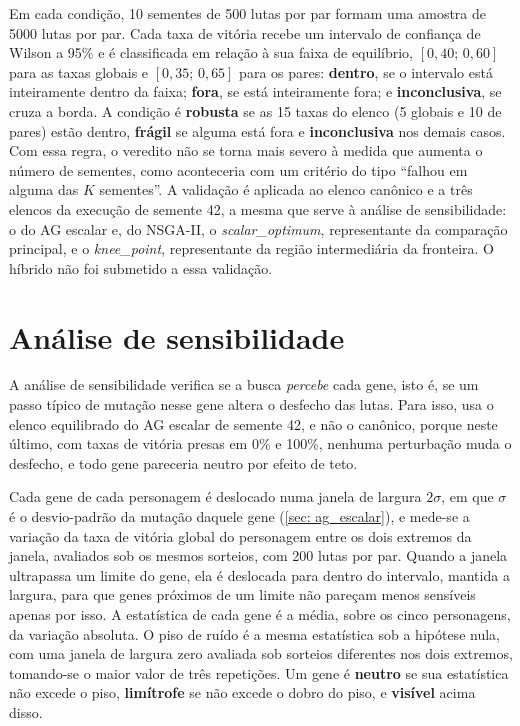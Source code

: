 Em cada condição, 10 sementes de 500 lutas por par formam uma amostra de 5000 lutas por par. Cada taxa de vitória recebe um intervalo de confiança de Wilson a 95\% \cite{wilson1927probable} e é classificada em relação à sua faixa de equilíbrio, $[0{,}40;\, 0{,}60]$ para as taxas globais e $[0{,}35;\, 0{,}65]$ para os pares: \textbf{dentro}, se o intervalo está inteiramente dentro da faixa; \textbf{fora}, se está inteiramente fora; e \textbf{inconclusiva}, se cruza a borda. A condição é \textbf{robusta} se as 15 taxas do elenco (5 globais e 10 de pares) estão dentro, \textbf{frágil} se alguma está fora e \textbf{inconclusiva} nos demais casos. Com essa regra, o veredito não se torna mais severo à medida que aumenta o número de sementes, como aconteceria com um critério do tipo ``falhou em alguma das $K$ sementes''. A validação é aplicada ao elenco canônico e a três elencos da execução de semente 42, a mesma que serve à análise de sensibilidade: o do AG escalar e, do NSGA-II, o \textit{scalar\_optimum}, representante da comparação principal, e o \textit{knee\_point}, representante da região intermediária da fronteira. O híbrido não foi submetido a essa validação.

\section{Análise de sensibilidade}
\label{sec: sensibilidade}

A análise de sensibilidade verifica se a busca \textit{percebe} cada gene, isto é, se um passo típico de mutação nesse gene altera o desfecho das lutas. Para isso, usa o elenco equilibrado do AG escalar de semente 42, e não o canônico, porque neste último, com taxas de vitória presas em 0\% e 100\%, nenhuma perturbação muda o desfecho, e todo gene pareceria neutro por efeito de teto.

Cada gene de cada personagem é deslocado numa janela de largura $2\sigma$, em que $\sigma$ é o desvio-padrão da mutação daquele gene (\autoref{sec: ag_escalar}), e mede-se a variação da taxa de vitória global do personagem entre os dois extremos da janela, avaliados sob os mesmos sorteios, com 200 lutas por par. Quando a janela ultrapassa um limite do gene, ela é deslocada para dentro do intervalo, mantida a largura, para que genes próximos de um limite não pareçam menos sensíveis apenas por isso. A estatística de cada gene é a média, sobre os cinco personagens, da variação absoluta. O piso de ruído é a mesma estatística sob a hipótese nula, com uma janela de largura zero avaliada sob sorteios diferentes nos dois extremos, tomando-se o maior valor de três repetições. Um gene é \textbf{neutro} se sua estatística não excede o piso, \textbf{limítrofe} se não excede o dobro do piso, e \textbf{visível} acima disso.

